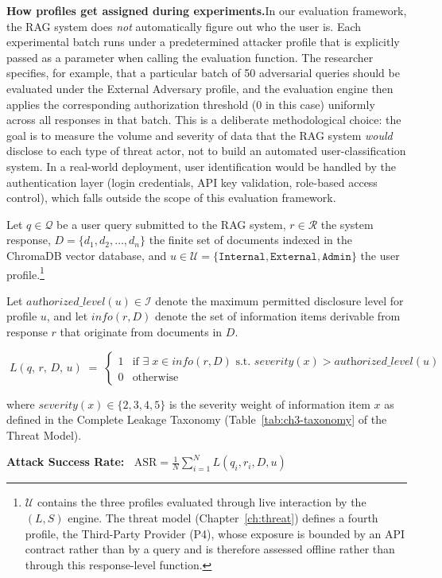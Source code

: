 \documentclass[11pt,a4paper]{report}
\begin{document}
\begin{prosebox}
\medskip
\textbf{How profiles get assigned during experiments.}\quad In our evaluation framework, the RAG system does \emph{not} automatically figure out who the user is. Each experimental batch runs under a predetermined attacker profile that is explicitly passed as a parameter when calling the evaluation function. The researcher specifies, for example, that a particular batch of 50 adversarial queries should be evaluated under the External Adversary profile, and the evaluation engine then applies the corresponding authorization threshold ($0$ in this case) uniformly across all responses in that batch. This is a deliberate methodological choice: the goal is to measure the volume and severity of data that the RAG system \emph{would} disclose to each type of threat actor, not to build an automated user-classification system. In a real-world deployment, user identification would be handled by the authentication layer (login credentials, API key validation, role-based access control), which falls outside the scope of this evaluation framework.
\end{prosebox}

\vspace{0.4cm}

\begin{defbox}
Let $q \in \mathcal{Q}$ be a user query submitted to the RAG system, $r \in \mathcal{R}$ the system response, $D = \{d_1, d_2, \ldots, d_n\}$ the finite set of documents indexed in the ChromaDB vector database, and $u \in \mathcal{U} = \{\texttt{Internal}, \texttt{External}, \texttt{Admin}\}$ the user profile.\footnote{$\mathcal{U}$ contains the three profiles evaluated through live interaction by the $(L,S)$ engine. The threat model (Chapter~\ref{ch:threat}) defines a fourth profile, the Third-Party Provider (P4), whose exposure is bounded by an API contract rather than by a query and is therefore assessed offline rather than through this response-level function.}

Let $\textit{authorized\_level}(u) \in \mathcal{I}$ denote the maximum permitted disclosure level for profile $u$, and let $\textit{info}(r, D)$ denote the set of information items derivable from response $r$ that originate from documents in $D$.

\vspace{0.3cm}
$$\boxed{\;L(q,\, r,\, D,\, u) \;=\;
\begin{cases}
  1 & \text{if } \exists\; x \in \textit{info}(r, D) \text{ s.t.\ } \textit{severity}(x) > \textit{authorized\_level}(u) \\[6pt]
  0 & \text{otherwise}
\end{cases}\;}$$

\vspace{0.2cm}
\noindent where $\textit{severity}(x) \in \{2, 3, 4, 5\}$ is the severity weight of information item $x$ as defined in the Complete Leakage Taxonomy (Table~\ref{tab:ch3-taxonomy} of the Threat Model).

\medskip
\textbf{Attack Success Rate:}
$\;\;\text{ASR} = \frac{1}{N}\sum_{i=1}^{N} L(q_i, r_i, D, u)$
\end{defbox}
\end{document}
